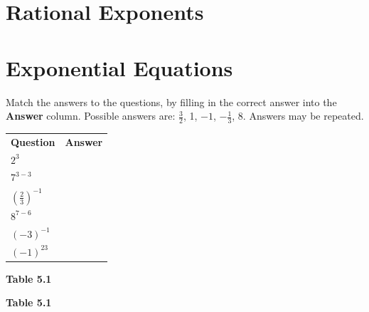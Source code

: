 \section{Rational Exponents}
\section{Exponential Equations}
            \nopagebreak
        \label{m38359*id67549}Match the answers to the questions, by filling in the correct answer into the \textbf{Answer} column.
Possible answers are: $\frac{3}{2}$, 1, $-1$, $-\frac{1}{3}$, 8. Answers may be repeated.\par 
          \begin{table}[H]
        \begin{center}
      \label{m38359*id67604}
    \noindent
      \tablelasttail{}
      \begin{xtabular}[t]{|l|l|}\hline
                  \textbf{Question}
                 &
                  \textbf{Answer}
     \tabularnewline{}
                  ${2}^{3}$
                 &
     \tabularnewline{}
                  ${7}^{3-3}$
                 &
     \tabularnewline{}
                  ${\left(\frac{2}{3}\right)}^{-1}$
                 &
     \tabularnewline{}
                  ${8}^{7-6}$
                 &
     \tabularnewline{}
                  ${\left(-3\right)}^{-1}$
                 &
     \tabularnewline{}
                  ${\left(-1\right)}^{23}$
                 &
     \tabularnewline{}
    \end{xtabular}
      \end{center}
    \begin{center}{\small\bfseries Table 5.1}\end{center}
    \begin{caption}{\small\bfseries Table 5.1}\end{caption}
\end{table}
